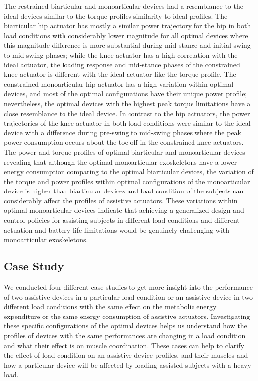 \documentclass[10pt,letterpaper]{article}
\begin{document}
The restrained biarticular and monoarticular devices had a resemblance to the ideal devices similar to the torque profiles similarity to ideal profiles. The biarticular hip actuator has mostly a similar power trajectory for the hip in both load conditions with considerably lower magnitude for all optimal devices where this magnitude difference is more substantial during mid-stance and initial swing to mid-swing phases; while the knee actuator has a high correlation with the ideal actuator, the loading response and mid-stance phases of the constrained knee actuator is different with the ideal actuator like the torque profile. The constrained monoarticular hip actuator has a high variation within optimal devices, and most of the optimal configurations have their unique power profile; nevertheless, the optimal devices with the highest peak torque limitations have a close resemblance to the ideal device. In contrast to the hip actuators, the power trajectories of the knee actuator in both load conditions were similar to the ideal device with a difference during pre-swing to mid-swing phases where the peak power consumption occurs about the toe-off in the constrained knee actuators.\\
The power and torque profiles of optimal biarticular and monoarticular devices revealing that although the optimal monoarticular exoskeletons have a lower energy consumption comparing to the optimal biarticular devices, the variation of the torque and power profiles within optimal configurations of the monoarticular device is higher than biarticular devices and load condition of the subjects can considerably affect the profiles of assistive actuators. These variations within optimal monoarticular devices indicate that achieving a generalized design and control policies for assisting subjects in different load conditions and different actuation and battery life limitations would be genuinely challenging with monoarticular exoskeletons.\\
\subsection*{Case Study}
We conducted four different case studies to get more insight into the performance of two assistive devices in a particular load condition or an assistive device in two different load conditions with the same effect on the metabolic energy expenditure or the same energy consumption of assistive actuators. Investigating these specific configurations of the optimal devices helps us understand how the profiles of devices with the same performances are changing in a load condition and what their effect is on muscle coordination. These cases can help to clarify the effect of load condition on an assistive device profiles, and their muscles and how a particular device will be affected by loading assisted subjects with a heavy load.
\end{document}
